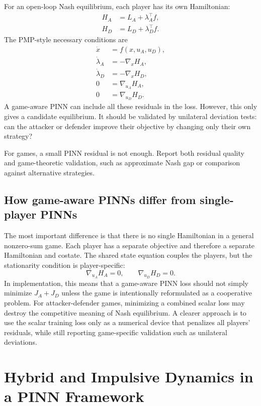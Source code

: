 \documentclass[11pt,a4paper]{article}
\begin{document}
For an open-loop Nash equilibrium, each player has its own Hamiltonian:
\begin{align}
    H_A &= L_A+\lambda_A^\top f,\\
    H_D &= L_D+\lambda_D^\top f.
\end{align}
The PMP-style necessary conditions are
\begin{align}
    \dot{x} &= f(x,u_A,u_D),\\
    \dot{\lambda}_A &= -\nabla_x H_A,\\
    \dot{\lambda}_D &= -\nabla_x H_D,\\
    0 &= \nabla_{u_A}H_A,\\
    0 &= \nabla_{u_D}H_D.
\end{align}
A game-aware PINN can include all these residuals in the loss. However, this only gives a candidate equilibrium. It should be validated by unilateral deviation tests: can the attacker or defender improve their objective by changing only their own strategy?

\begin{takeaway}
For games, a small PINN residual is not enough. Report both residual quality and game-theoretic validation, such as approximate Nash gap or comparison against alternative strategies.
\end{takeaway}

\subsection{How game-aware PINNs differ from single-player PINNs}
The most important difference is that there is no single Hamiltonian in a general nonzero-sum game. Each player has a separate objective and therefore a separate Hamiltonian and costate. The shared state equation couples the players, but the stationarity condition is player-specific:
\begin{equation}
    \nabla_{u_A}H_A=0, \qquad \nabla_{u_D}H_D=0.
\end{equation}
In implementation, this means that a game-aware PINN loss should not simply minimize $J_A+J_D$ unless the game is intentionally reformulated as a cooperative problem. For attacker-defender games, minimizing a combined scalar loss may destroy the competitive meaning of Nash equilibrium. A clearer approach is to use the scalar training loss only as a numerical device that penalizes all players' residuals, while still reporting game-specific validation such as unilateral deviations.

\section{Hybrid and Impulsive Dynamics in a PINN Framework}
\end{document}
